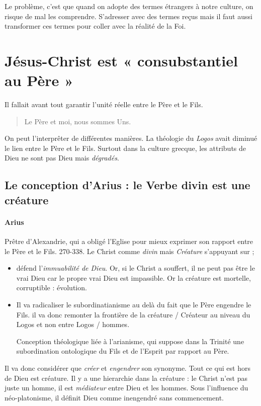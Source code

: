 Le problème, c'est que quand on adopte des termes étrangers à notre culture, on risque de mal les comprendre. S'adresser avec des termes reçus mais il faut aussi transformer ces termes pour coller avec la réalité de la Foi.

\section{Jésus-Christ est « consubstantiel au Père »}
  
Il fallait avant tout garantir l'unité réelle entre le Père et le Fils.
\begin{quote}
    Le Père et moi, nous sommes Uns.
\end{quote}
On peut l'interprêter de différentes manières.
La théologie du \emph{Logos} avait diminué le lien entre le Père et le Fils.
Surtout dans la culture grecque, les attributs de Dieu ne sont pas Dieu mais \textit{dégradés}.


  
  
\subsection{Le conception d'Arius : le Verbe divin est une créature}

\paragraph{Arius} Prêtre d'Alexandrie, qui a obligé l'Eglise pour mieux exprimer son rapport entre le Père et le Fils. 270-338. Le Christ comme \textit{divin} mais \textit{Créature} s'appuyant sur ; 
\begin{itemize}
    \item défend l'\textit{immuabilité de Dieu}. Or, si le Christ a souffert, il ne peut pas être le vrai Dieu car le propre vrai Dieu est impassible. Or la créature est mortelle, corruptible : évolution. 
    \item Il va radicaliser le subordinatianisme au delà du fait que le Père engendre le Fils. il va donc remonter la frontière de la créature / Créateur au niveau du Logos et non entre Logos / hommes.
    \begin{Def}[subordinatianisme]
    Conception théologique liée à l'arianisme, qui suppose dans la Trinité une subordination ontologique du Fils et de l'Esprit par rapport au Père.
    \end{Def}
\end{itemize}
Il va donc considérer que \textit{créer} et \textit{engendrer} son synonyme. Tout ce qui est hors de Dieu est créature.
Il y a une hierarchie dans la créature : le Christ n'est pas juste un homme, il est \textit{médiateur} entre Dieu et les hommes. Sous l'influence du néo-platonisme, il définit Dieu comme inengendré sans commencement.

